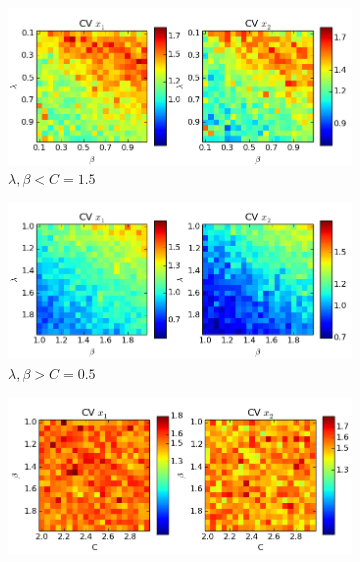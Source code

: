 \documentclass[a4paper,12pt]{article}
\begin{document}
\begin{figure}[!ht]
        \centering
        \begin{subfigure}[b]{0.49\textwidth}
                \includegraphics[width=\textwidth]{images/vars1}
                \caption{$\lambda, \beta < C=1.5$}
                \label{fig:vars1}
        \end{subfigure}%
        \hfill
        \begin{subfigure}[b]{0.49\textwidth}
                \includegraphics[width=\textwidth]{images/vars2}
                \caption{$\lambda, \beta > C=0.5$}
                \label{fig:vars2}
        \end{subfigure}
          \newline
        \begin{subfigure}[b]{0.496\textwidth}
        \centering
                \includegraphics[width=\textwidth]{images/vars3}

\end{subfigure}
\end{figure}
\end{document}
